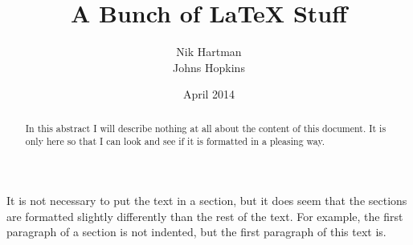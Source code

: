 \documentclass{article} %
\begin{document}

\title{A Bunch of \LaTeX{} Stuff} %
\author{Nik Hartman\\
        Johns Hopkins} %
\date{April 2014}
\maketitle

\begin{abstract}

In this abstract I will describe nothing at all about the content of this document. It is only here 
so that I can look and see if it is formatted in a pleasing way.

\end{abstract}






\hfill\newline %
\noindent It is not necessary to put the text in a section, but it does seem that the sections are formatted 
slightly differently than the rest of the text. For example, the first paragraph of a section is not
indented, but the first paragraph of this text is. 

\clearpage %
\end{document}
